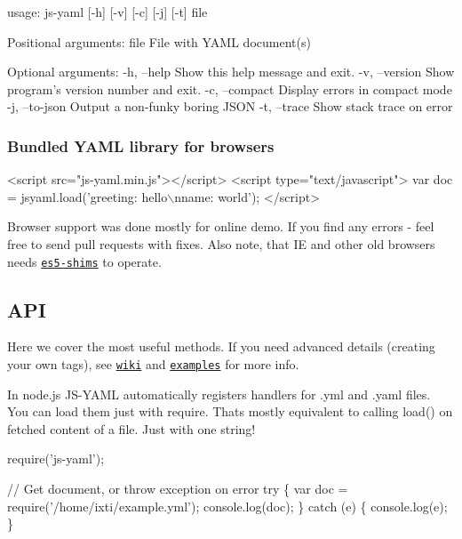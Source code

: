 \begin{DoxyCode}
usage: js-yaml [-h] [-v] [-c] [-j] [-t] file

Positional arguments:
  file           File with YAML document(s)

Optional arguments:
  -h, --help     Show this help message and exit.
  -v, --version  Show program's version number and exit.
  -c, --compact  Display errors in compact mode
  -j, --to-json  Output a non-funky boring JSON
  -t, --trace    Show stack trace on error
\end{DoxyCode}


\subsubsection*{Bundled Y\+A\+ML library for browsers}


\begin{DoxyCode}
<script src="js-yaml.min.js"></script>
<script type="text/javascript">
var doc = jsyaml.load('greeting: hello\(\backslash\)nname: world');
</script>
\end{DoxyCode}


Browser support was done mostly for online demo. If you find any errors -\/ feel free to send pull requests with fixes. Also note, that IE and other old browsers needs \href{https://github.com/kriskowal/es5-shim}{\tt es5-\/shims} to operate.

\subsection*{A\+PI }

Here we cover the most \textquotesingle{}useful\textquotesingle{} methods. If you need advanced details (creating your own tags), see \href{https://github.com/nodeca/js-yaml/wiki}{\tt wiki} and \href{https://github.com/nodeca/js-yaml/tree/master/examples}{\tt examples} for more info.

In node.\+js J\+S-\/\+Y\+A\+ML automatically registers handlers for {\ttfamily .yml} and {\ttfamily .yaml} files. You can load them just with {\ttfamily require}. That\textquotesingle{}s mostly equivalent to calling {\ttfamily load()} on fetched content of a file. Just with one string!


\begin{DoxyCode}
require('js-yaml');

// Get document, or throw exception on error
try \{
  var doc = require('/home/ixti/example.yml');
  console.log(doc);
\} catch (e) \{
  console.log(e);
\}
\end{DoxyCode}


